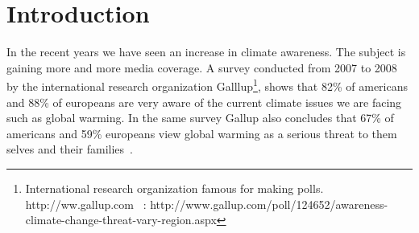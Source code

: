 \part{Introduction}
\label{introduction}

In the recent years we have seen an increase in climate awareness. The subject is gaining more and more media coverage. A survey conducted from 2007 to 2008 by the international research organization Galllup\footnote{International research organization famous for making polls. http:/\slash ww.gallup.com
~\citep{gallup-2009}: http:/\slash www.gallup.com\slash poll\slash 124652\slash awareness-climate-change-threat-vary-region.aspx}, shows that 82\% of americans and 88\% of europeans are very aware of the current climate issues we are facing such as global warming. In the same survey Gallup also concludes that 67\% of americans and 59\% europeans view global warming as a serious threat to them selves and their families~\citep{gallup-2009}.
